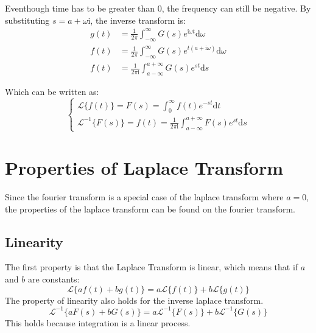 \documentclass[12pt]{article}
\begin{document}
Eventhough time has to be greater than 0, the frequency can still be negative. By substituting $s=a+\omega\mathrm{i}$, 
the inverse transform is:
$$\begin{aligned}
    g(t) &= \frac{1}{2\pi} \int_{-\infty}^{\infty} 
        G(s)e^{\mathrm{i}\omega t} \mathrm{d}\omega  \\
    f(t) &= \frac{1}{2\pi} \int_{-\infty}^{\infty} 
            G(s)e^{t(a+\mathrm{i}\omega)} \mathrm{d}\omega  \\
    f(t) &= \frac{1}{2\pi\mathrm{i}} \int_{a-\infty}^{a+\infty} G(s)e^{st} \mathrm{d}s
\end{aligned}$$

Which can be written as:
\begin{equation}\begin{cases}
    \mathcal{L}\{f(t)\} = F(s) = \displaystyle\int_{0}^{\infty} f(t)e^{-st} \mathrm{d}t     \\
    \mathcal{L}^{-1}\{F(s)\} = f(t) = \frac{1}{2\pi\mathrm{i}} \displaystyle\int_{a-\infty}^{a+\infty} F(s)e^{st} \mathrm{d}s
\end{cases}
\label{equ:laplace_transfrom}
\end{equation}












\section{Properties of Laplace Transform}
Since the fourier transform is a special case of the laplace transform where $a=0$, 
the properties of the laplace transform can be found on the fourier transform.  

\subsection{Linearity}
The first property is that the Laplace Transform is linear, which means that if $a$ and $b$ are constants: 
\begin{equation}
    \mathcal{L}\{af(t)+bg(t)\} = a\mathcal{L}\{f(t)\} + b\mathcal{L}\{g(t)\}
\end{equation}
The property of linearity also holds for the inverse laplace transform. 
\begin{equation}
    \mathcal{L}^{-1}\{aF(s)+bG(s)\} = a\mathcal{L}^{-1}\{F(s)\} + b\mathcal{L}^{-1}\{G(s)\}
\end{equation}
This holds because integration is a linear process. 
 
\end{document}
